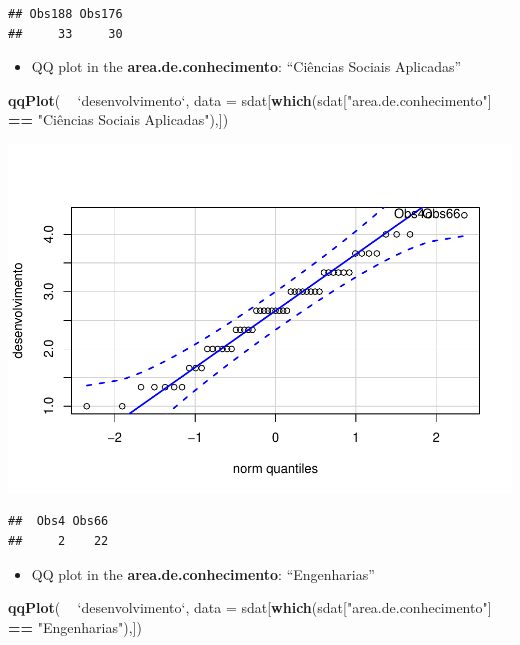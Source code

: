 \documentclass[]{article}
\newenvironment{Shaded}{\begin{snugshade}}{\end{snugshade}}
\newcommand{\DataTypeTok}[1]{\textcolor[rgb]{0.13,0.29,0.53}{#1}}
\newcommand{\KeywordTok}[1]{\textcolor[rgb]{0.13,0.29,0.53}{\textbf{#1}}}
\newcommand{\NormalTok}[1]{#1}
\newcommand{\OperatorTok}[1]{\textcolor[rgb]{0.81,0.36,0.00}{\textbf{#1}}}
\newcommand{\StringTok}[1]{\textcolor[rgb]{0.31,0.60,0.02}{#1}}
\providecommand{\tightlist}{%
  \setlength{\itemsep}{0pt}\setlength{\parskip}{0pt}}
\begin{document}
\begin{verbatim}
## Obs188 Obs176 
##     33     30
\end{verbatim}

\begin{itemize}
\tightlist
\item
  QQ plot in the \textbf{area.de.conhecimento}: ``Ciências Sociais
  Aplicadas''
\end{itemize}

\begin{Shaded}
\begin{Highlighting}[]
\KeywordTok{qqPlot}\NormalTok{( }\OperatorTok{~}\StringTok{ `}\DataTypeTok{desenvolvimento}\StringTok{`}\NormalTok{, }\DataTypeTok{data =}\NormalTok{ sdat[}\KeywordTok{which}\NormalTok{(sdat[}\StringTok{"area.de.conhecimento"}\NormalTok{] }\OperatorTok{==}\StringTok{ "Ciências Sociais Aplicadas"}\NormalTok{),])}
\end{Highlighting}
\end{Shaded}

\includegraphics{factorialAnova_files/figure-latex/unnamed-chunk-27-1.pdf}

\begin{verbatim}
##  Obs4 Obs66 
##     2    22
\end{verbatim}

\begin{itemize}
\tightlist
\item
  QQ plot in the \textbf{area.de.conhecimento}: ``Engenharias''
\end{itemize}

\begin{Shaded}
\begin{Highlighting}[]
\KeywordTok{qqPlot}\NormalTok{( }\OperatorTok{~}\StringTok{ `}\DataTypeTok{desenvolvimento}\StringTok{`}\NormalTok{, }\DataTypeTok{data =}\NormalTok{ sdat[}\KeywordTok{which}\NormalTok{(sdat[}\StringTok{"area.de.conhecimento"}\NormalTok{] }\OperatorTok{==}\StringTok{ "Engenharias"}\NormalTok{),])}
\end{Highlighting}
\end{Shaded}
\end{document}
